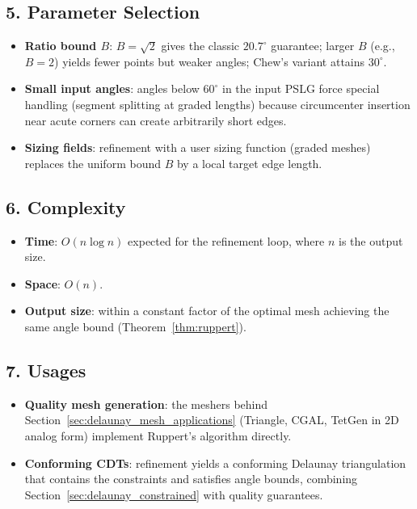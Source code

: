 \subsection{5. Parameter Selection}

\begin{itemize}
\item \textbf{Ratio bound $B$}: $B = \sqrt{2}$ gives the classic
  $20.7^\circ$ guarantee; larger $B$ (e.g., $B = 2$) yields fewer points but
  weaker angles; Chew's variant attains $30^\circ$.
\item \textbf{Small input angles}: angles below $60^\circ$ in the input PSLG
  force special handling (segment splitting at graded lengths) because
  circumcenter insertion near acute corners can create arbitrarily short edges.
\item \textbf{Sizing fields}: refinement with a user sizing function
  (graded meshes) replaces the uniform bound $B$ by a local target edge length.
\end{itemize}

\subsection{6. Complexity}

\begin{itemize}
\item \textbf{Time}: $O(n \log n)$ expected for the refinement loop, where $n$ is
  the output size.
\item \textbf{Space}: $O(n)$.
\item \textbf{Output size}: within a constant factor of the optimal mesh
  achieving the same angle bound (Theorem~\ref{thm:ruppert}).
\end{itemize}

\subsection{7. Usages}

\begin{itemize}
\item \textbf{Quality mesh generation}: the meshers behind
  Section~\ref{sec:delaunay_mesh_applications} (Triangle, CGAL, TetGen in 2D
  analog form) implement Ruppert's algorithm directly.
\item \textbf{Conforming CDTs}: refinement yields a conforming Delaunay
  triangulation that contains the constraints and satisfies angle bounds,
  combining Section~\ref{sec:delaunay_constrained} with quality guarantees.
\end{itemize}

